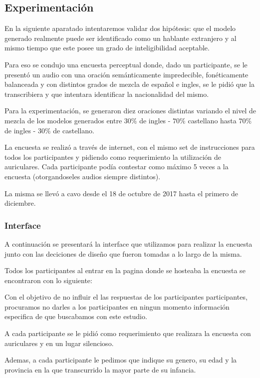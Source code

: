 \subsection{Experimentación}

En la siguiente aparatado intentaremos validar dos hipótesis: que el modelo generado realmente puede ser identificado como un hablante extranjero y al mismo tiempo que este posee un grado de inteligibilidad aceptable.

Para eso se condujo una encuesta perceptual donde, dado un participante, se le presentó un audio con una oración semánticamente impredecible, fonéticamente balanceada y con distintos grados de mezcla de español e ingles, se le pidió que la transcribiera y que intentara identificar la nacionalidad del mismo.

Para la experimentación, se generaron diez oraciones distintas variando el nivel de mezcla de los modelos generados entre $30\%$ de ingles - $70\%$ castellano hasta $70\%$ de ingles - $30\%$ de castellano.

La encuesta se realizó a través de internet, con el mismo set de instrucciones para todos los participantes y pidiendo como requerimiento la utilización de auriculares. Cada participante podía contestar como máximo 5 veces a la encuesta (otorgandoseles audios siempre distintos).

La misma se llevó a cavo desde el 18 de octubre de 2017 hasta el primero de diciembre.

\subsubsection{Interface}

A continuación se presentará la interface que utilizamos para realizar la encuesta junto con las deciciones de diseño que fueron tomadas a lo largo de la misma. 

Todos los participantes al entrar en la pagina donde se hosteaba la encuesta se encontraron con lo siguiente:

Con el objetivo de no influir el las respuestas de los participantes participantes, procuramos no darles a los participantes en ningun momento información especifica de que buscabamos con este estudio.

A cada participante se le pidió como requerimiento que realizara la encuesta con auriculares y en un lugar silencioso.

Ademas, a cada participante le pedimos que indique su genero, su edad y la provincia en la que transcurrido la mayor parte de su infancia.

